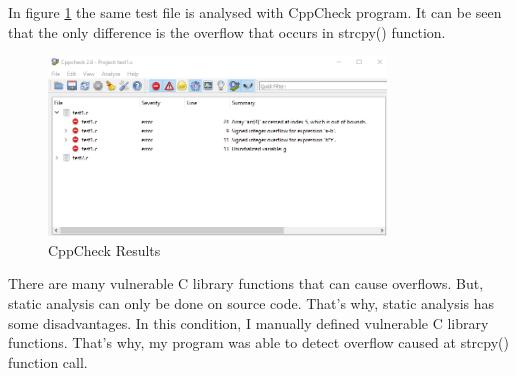 In figure \ref{fig:TestCppResult} the same test file is analysed with CppCheck program. It can be seen that the only difference is the overflow that occurs in strcpy() function. 

\begin{figure}[!htbp]
    \centering
    \includegraphics[width=0.8\textwidth]{Imgs/cppcheck_test.png}
    \caption{\label{fig:TestCppResult} CppCheck Results}
\end{figure}

There are many vulnerable C library functions that can cause overflows. But, static analysis can only be done on source code. That's why, static analysis has some disadvantages. In this condition, I manually defined vulnerable C library functions. That's why, my program was able to detect overflow caused at strcpy() function call.
